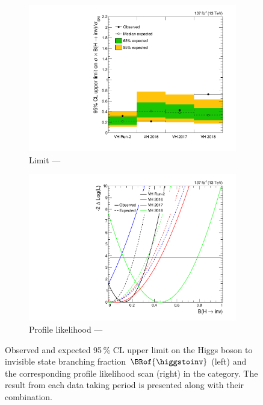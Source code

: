 \begin{figure}[htbp]
    \centering
    \begin{subfigure}[t]{0.45\textwidth}
        \includegraphics[width=\textwidth]{figures/limits/VH/limit_Run2_VH.pdf}
        \caption{Limit --- \VH}
    \end{subfigure}
    \hspace{0.05\textwidth}
    \begin{subfigure}[t]{0.45\textwidth}
        \includegraphics[width=\textwidth]{figures/likelihood_scan/profile_likelihood_scan_Run2_VH.pdf}
        \caption{Profile likelihood --- \VH}
    \end{subfigure}
    \caption[Observed and expected 95\,\% CL upper limit on the Higgs boson to invisible state branching fraction $\BRof{\higgstoinv}$ (left) and the corresponding profile likelihood scan (right) in the \VH category]{Observed and expected 95\,\% CL upper limit on the Higgs boson to invisible state branching fraction $\BRof{\higgstoinv}$ (left) and the corresponding profile likelihood scan (right) in the \VH category. The result from each data taking period is presented along with their combination.}
    \label{fig:htoinv_limit_VH}
\end{figure}

